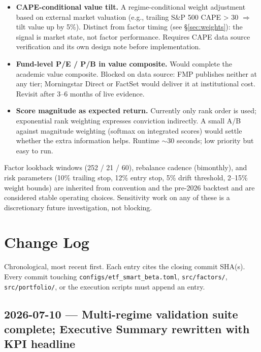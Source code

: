 \documentclass[11pt,a4paper]{article}
\begin{document}
\begin{itemize}[noitemsep]
    \item \textbf{CAPE-conditional value tilt.} A regime-conditional weight adjustment based on external market valuation (e.g., trailing S\&P 500 CAPE > 30 $\Rightarrow$ tilt value up by 5\%). Distinct from factor timing (see \S\ref{sec:weights}): the signal is market state, not factor performance. Requires CAPE data source verification and its own design note before implementation.
    \item \textbf{Fund-level P/E / P/B in value composite.} Would complete the academic value composite. Blocked on data source: FMP publishes neither at any tier; Morningstar Direct or FactSet would deliver it at institutional cost. Revisit after 3--6 months of live evidence.
    \item \textbf{Score magnitude as expected return.} Currently only rank order is used; exponential rank weighting expresses conviction indirectly. A small A/B against magnitude weighting (softmax on integrated scores) would settle whether the extra information helps. Runtime $\sim$30 seconds; low priority but easy to run.
\end{itemize}

Factor lookback windows (252 / 21 / 60), rebalance cadence (bimonthly), and risk parameters (10\% trailing stop, 12\% entry stop, 5\% drift threshold, 2--15\% weight bounds) are inherited from convention and the pre-2026 backtest and are considered stable operating choices. Sensitivity work on any of these is a discretionary future investigation, not blocking.

\section{Change Log}
\label{sec:changelog}

Chronological, most recent first. Each entry cites the closing commit SHA(s). Every commit touching \texttt{configs/etf\_smart\_beta.toml}, \texttt{src/factors/}, \texttt{src/portfolio/}, or the execution scripts must append an entry.

\subsection*{2026-07-10 --- Multi-regime validation suite complete; Executive Summary rewritten with KPI headline}
\end{document}
